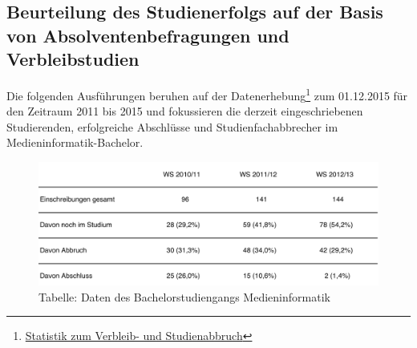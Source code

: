 \subsection{Beurteilung des Studienerfolgs auf der Basis von
Absolventenbefragungen und
Verbleibstudien}\label{beurteilung-des-studienerfolgs-auf-der-basis-von-absolventenbefragungen-und-verbleibstudien}

Die folgenden Ausführungen beruhen auf der Datenerhebung\footnote{\href{../anhaenge/verbleib-und-studienabbruch.pdf}{Statistik
  zum Verbleib- und Studienabbruch}} zum 01.12.2015 für den Zeitraum
2011 bis 2015 und fokussieren die derzeit eingeschriebenen Studierenden,
erfolgreiche Abschlüsse und Studienfachabbrecher im
Medieninformatik-Bachelor.

\begin{figure}[htbp]
\centering
\includegraphics[width=\columnwidth]{../anhaenge/tabellen/MI-BA-anzahl-studierende.png}
\caption{Tabelle: Daten des Bachelorstudiengangs Medieninformatik}
\end{figure}

